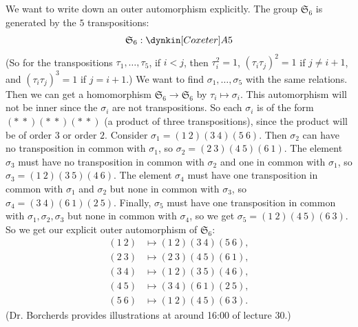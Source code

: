 \documentclass[11pt, twoside]{amsart}
\begin{document}
We want to write down an outer automorphism explicitly. The group $\mathfrak{S}_6$ is generated by the $5$ transpositions:
$$
\mathfrak{S}_6 : \dynkin [Coxeter]A{5}
$$
(So for the transpositions $\tau_1,\hdots, \tau_5$, if $i < j$, then $\tau_i^2 = 1$, $(\tau_i\tau_j)^2=1$ if $j \ne i+1$, and $(\tau_i\tau_j)^3=1$ if $j = i+1$.) We want to find $\sigma_1 ,\hdots,\sigma_5$ with the same relations. Then we can get a homomorphism $\mathfrak{S}_6\longrightarrow\mathfrak{S}_6$ by $\tau_i \mapsto \sigma_i$. This automorphism will not be inner since the $\sigma_i$ are not transpositions. So each $\sigma_i$ is of the form $(*\ *)(*\ *)(*\ *)$ (a product of three transpositions), since the product will be of order $3$ or order $2$. Consider $\sigma_1 = (1\ 2)(3\ 4)(5\ 6)$. Then $\sigma_2$ can have no transposition in common with $\sigma_1$, so $\sigma_2 = (2\ 3)(4\ 5)(6\ 1)$. The element $\sigma_3$ must have no transposition in common with $\sigma_2$ and one in common with $\sigma_1$, so $\sigma_3 = (1\ 2)(3\ 5)(4\ 6)$. The element $\sigma_4$ must have one transposition in common with $\sigma_1$ and $\sigma_2$ but none in common with $\sigma_3$, so $\sigma_4 = (3\ 4)(6\ 1)(2\ 5)$. Finally, $\sigma_5$ must have one transposition in common with $\sigma_1,\sigma_2,\sigma_3$ but none in common with $\sigma_4$, so we get $\sigma_5 = (1\ 2)(4\ 5)(6\ 3)$. So we get our explicit outer automorphism of $\mathfrak{S}_6$:
\begin{align*}
(1\ 2) &\mapsto (1\ 2)(3\ 4)(5\ 6),\\
(2\ 3) &\mapsto (2\ 3)(4\ 5)(6\ 1),\\
(3\ 4) &\mapsto (1\ 2)(3\ 5)(4\ 6),\\
(4\ 5) &\mapsto (3\ 4)(6\ 1)(2\ 5),\\
(5\ 6) &\mapsto (1\ 2)(4\ 5)(6\ 3).
\end{align*}
(Dr. Borcherds provides illustrations at around 16:00 of lecture 30.) 
\end{document}

